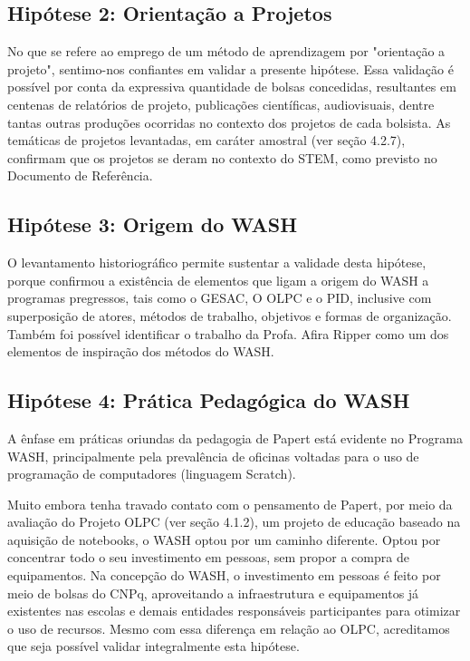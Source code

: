 \subsection[Hipótese 2: Orientação a Projetos]{Hipótese 2: Orientação a Projetos}\label{Hipótese 2: Orientação a Projetos}
No que se refere ao emprego de um método de aprendizagem por "orientação a projeto", sentimo-nos confiantes em validar a presente hipótese. Essa validação é possível por conta da expressiva quantidade de bolsas concedidas, resultantes em centenas de relatórios de projeto, publicações científicas, audiovisuais, dentre tantas outras produções ocorridas no contexto dos projetos de cada bolsista. As temáticas de projetos levantadas, em caráter amostral (ver seção 4.2.7), confirmam que os projetos se deram no contexto do STEM, como previsto no Documento de Referência.

\subsection[Hipótese 3: Origem do WASH]{Hipótese 3: Origem do WASH}\label{Hipótese 3: Origem do WASH}
O levantamento historiográfico permite sustentar a validade desta hipótese, porque confirmou a existência de elementos que ligam a origem do WASH a programas pregressos, tais como o GESAC, O OLPC e o PID, inclusive com superposição de atores, métodos de trabalho, objetivos e formas de organização. Também foi possível identificar o trabalho da Profa. Afira Ripper como um dos elementos de inspiração dos métodos do WASH.

\subsection[Hipótese 4: Prática Pedagógica do WASH]{Hipótese 4: Prática Pedagógica do WASH}\label{Hipótese 4: Prática Pedagógica do WASH}
A ênfase em práticas oriundas da pedagogia de Papert está evidente no Programa WASH, principalmente pela prevalência de oficinas voltadas para o uso de programação de computadores (linguagem Scratch).

Muito embora tenha travado contato com o pensamento de Papert, por meio da avaliação do Projeto OLPC (ver seção 4.1.2), um projeto de educação baseado na aquisição de notebooks, o WASH optou por um caminho diferente. Optou por concentrar todo o seu investimento em pessoas, sem propor a compra de equipamentos. Na concepção do WASH, o investimento em pessoas é feito por meio de bolsas do CNPq, aproveitando a infraestrutura e equipamentos já existentes nas escolas e demais entidades responsáveis participantes para otimizar o uso de recursos.  Mesmo com essa diferença em relação ao OLPC, acreditamos que seja possível validar integralmente esta hipótese.

